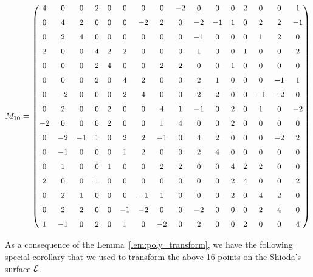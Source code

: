 \documentclass[11pt]{amsart}
\begin{document}
\begin{thm}
		\[
	\small %
	\setcounter{MaxMatrixCols}{20} %
	M_{10}=
	\begin{pmatrix}
	 	4 & 0 & 0 & 2 & 0 & 0 & 0 & 0 & -2 & 0 & 0 & 0 & 2 & 0 & 0 & 1 	\\ \noalign{\medskip}
	 	0 & 4 & 2 & 0 & 0 & 0 & -2 & 2 & 0 & -2 & -1 & 1 & 0 & 2 & 2 & -1 	\\ \noalign{\medskip}
	 	0 & 2 & 4 & 0 & 0 & 0 & 0 & 0 & 0 & -1 & 0 & 0 & 0 & 1 & 2 & 0 	\\ \noalign{\medskip}
	 	2 & 0 & 0 & 4 & 2 & 2 & 0 & 0 & 0 & 1 & 0 & 0 & 1 & 0 & 0 & 2 	\\ \noalign{\medskip}
	 	0 & 0 & 0 & 2 & 4 & 0 & 0 & 2 & 2 & 0 & 0 & 1 & 0 & 0 & 0 & 0 	\\ \noalign{\medskip}
	 	0 & 0 & 0 & 2 & 0 & 4 & 2 & 0 & 0 & 2 & 1 & 0 & 0 & 0 & -1 & 1 	\\ \noalign{\medskip}
	 	0 & -2 & 0 & 0 & 0 & 2 & 4 & 0 & 0 & 2 & 2 & 0 & 0 & -1 & -2 & 0 	\\ \noalign{\medskip}
	 	0 & 2 & 0 & 0 & 2 & 0 & 0 & 4 & 1 & -1 & 0 & 2 & 0 & 1 & 0 & -2 	\\ \noalign{\medskip}
	 	-2 & 0 & 0 & 0 & 2 & 0 & 0 & 1 & 4 & 0 & 0 & 2 & 0 & 0 & 0 & 0 	\\ \noalign{\medskip}
	 	0 & -2 & -1 & 1 & 0 & 2 & 2 & -1 & 0 & 4 & 2 & 0 & 0 & 0 & -2 & 2 	\\ \noalign{\medskip}
	 	0 & -1 & 0 & 0 & 0 & 1 & 2 & 0 & 0 & 2 & 4 & 0 & 0 & 0 & 0 & 0 	\\ \noalign{\medskip}
	 	0 & 1 & 0 & 0 & 1 & 0 & 0 & 2 & 2 & 0 & 0 & 4 & 2 & 2 & 0 & 0 	\\ \noalign{\medskip}
	 	2 & 0 & 0 & 1 & 0 & 0 & 0 & 0 & 0 & 0 & 0 & 2 & 4 & 0 & 0 & 2 	\\ \noalign{\medskip}
	 	0 & 2 & 1 & 0 & 0 & 0 & -1 & 1 & 0 & 0 & 0 & 2 & 0 & 4 & 2 & 0 	\\ \noalign{\medskip}
	 	0 & 2 & 2 & 0 & 0 & -1 & -2 & 0 & 0 & -2 & 0 & 0 & 0 & 2 & 4 & 0 	\\ \noalign{\medskip}
	 	1 & -1 & 0 & 2 & 0 & 1 & 0 & -2 & 0 & 2 & 0 & 0 & 2 & 0 & 0 & 4
	\end{pmatrix}
\]	

\end{thm}

 
 As a consequence of the Lemma~\ref{lem:poly_transform}, we have the following special corollary that we used to transform the above 16 points on the Shioda's surface ${\mathcal E}$.
 
\end{document}
